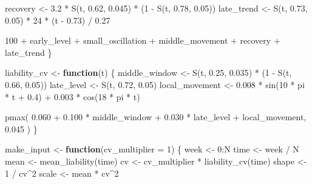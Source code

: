 \documentclass[
  10pt,
]{article}
\newenvironment{Shaded}{\begin{snugshade}}{\end{snugshade}}
\newcommand{\AttributeTok}[1]{\textcolor[rgb]{0.77,0.63,0.00}{#1}}
\newcommand{\ControlFlowTok}[1]{\textcolor[rgb]{0.13,0.29,0.53}{\textbf{#1}}}
\newcommand{\DecValTok}[1]{\textcolor[rgb]{0.00,0.00,0.81}{#1}}
\newcommand{\FloatTok}[1]{\textcolor[rgb]{0.00,0.00,0.81}{#1}}
\newcommand{\FunctionTok}[1]{\textcolor[rgb]{0.00,0.00,0.00}{#1}}
\newcommand{\NormalTok}[1]{#1}
\newcommand{\OtherTok}[1]{\textcolor[rgb]{0.56,0.35,0.01}{#1}}
\newcommand{\SpecialCharTok}[1]{\textcolor[rgb]{0.00,0.00,0.00}{#1}}
\begin{document}
\begin{Shaded}
\begin{Highlighting}[]
\NormalTok{  recovery }\OtherTok{\textless{}{-}}
    \FloatTok{3.2} \SpecialCharTok{*} \FunctionTok{S}\NormalTok{(t, }\FloatTok{0.62}\NormalTok{, }\FloatTok{0.045}\NormalTok{) }\SpecialCharTok{*}\NormalTok{ (}\DecValTok{1} \SpecialCharTok{{-}} \FunctionTok{S}\NormalTok{(t, }\FloatTok{0.78}\NormalTok{, }\FloatTok{0.05}\NormalTok{))}
\NormalTok{  late\_trend }\OtherTok{\textless{}{-}} \FunctionTok{S}\NormalTok{(t, }\FloatTok{0.73}\NormalTok{, }\FloatTok{0.05}\NormalTok{) }\SpecialCharTok{*} \DecValTok{24} \SpecialCharTok{*}\NormalTok{ (t }\SpecialCharTok{{-}} \FloatTok{0.73}\NormalTok{) }\SpecialCharTok{/} \FloatTok{0.27}

  \DecValTok{100} \SpecialCharTok{+}\NormalTok{ early\_level }\SpecialCharTok{+}\NormalTok{ small\_oscillation }\SpecialCharTok{+}\NormalTok{ middle\_movement }\SpecialCharTok{+}
\NormalTok{    recovery }\SpecialCharTok{+}\NormalTok{ late\_trend}
\NormalTok{\}}

\NormalTok{liability\_cv }\OtherTok{\textless{}{-}} \ControlFlowTok{function}\NormalTok{(t) \{}
\NormalTok{  middle\_window }\OtherTok{\textless{}{-}} \FunctionTok{S}\NormalTok{(t, }\FloatTok{0.25}\NormalTok{, }\FloatTok{0.035}\NormalTok{) }\SpecialCharTok{*}\NormalTok{ (}\DecValTok{1} \SpecialCharTok{{-}} \FunctionTok{S}\NormalTok{(t, }\FloatTok{0.66}\NormalTok{, }\FloatTok{0.05}\NormalTok{))}
\NormalTok{  late\_level }\OtherTok{\textless{}{-}} \FunctionTok{S}\NormalTok{(t, }\FloatTok{0.72}\NormalTok{, }\FloatTok{0.05}\NormalTok{)}
\NormalTok{  local\_movement }\OtherTok{\textless{}{-}}
    \FloatTok{0.008} \SpecialCharTok{*} \FunctionTok{sin}\NormalTok{(}\DecValTok{10} \SpecialCharTok{*}\NormalTok{ pi }\SpecialCharTok{*}\NormalTok{ t }\SpecialCharTok{+} \FloatTok{0.4}\NormalTok{) }\SpecialCharTok{+}
    \FloatTok{0.003} \SpecialCharTok{*} \FunctionTok{cos}\NormalTok{(}\DecValTok{18} \SpecialCharTok{*}\NormalTok{ pi }\SpecialCharTok{*}\NormalTok{ t)}

  \FunctionTok{pmax}\NormalTok{(}
    \FloatTok{0.060} \SpecialCharTok{+} \FloatTok{0.100} \SpecialCharTok{*}\NormalTok{ middle\_window }\SpecialCharTok{+} \FloatTok{0.030} \SpecialCharTok{*}\NormalTok{ late\_level }\SpecialCharTok{+}
\NormalTok{      local\_movement,}
    \FloatTok{0.045}
\NormalTok{  )}
\NormalTok{\}}

\NormalTok{make\_input }\OtherTok{\textless{}{-}} \ControlFlowTok{function}\NormalTok{(}\AttributeTok{cv\_multiplier =} \DecValTok{1}\NormalTok{) \{}
\NormalTok{  week }\OtherTok{\textless{}{-}} \DecValTok{0}\SpecialCharTok{:}\NormalTok{N}
\NormalTok{  time }\OtherTok{\textless{}{-}}\NormalTok{ week }\SpecialCharTok{/}\NormalTok{ N}
\NormalTok{  mean }\OtherTok{\textless{}{-}} \FunctionTok{mean\_liability}\NormalTok{(time)}
\NormalTok{  cv }\OtherTok{\textless{}{-}}\NormalTok{ cv\_multiplier }\SpecialCharTok{*} \FunctionTok{liability\_cv}\NormalTok{(time)}
\NormalTok{  shape }\OtherTok{\textless{}{-}} \DecValTok{1} \SpecialCharTok{/}\NormalTok{ cv}\SpecialCharTok{\^{}}\DecValTok{2}
\NormalTok{  scale }\OtherTok{\textless{}{-}}\NormalTok{ mean }\SpecialCharTok{*}\NormalTok{ cv}\SpecialCharTok{\^{}}\DecValTok{2}


\end{Highlighting}
\end{Shaded}
\end{document}
